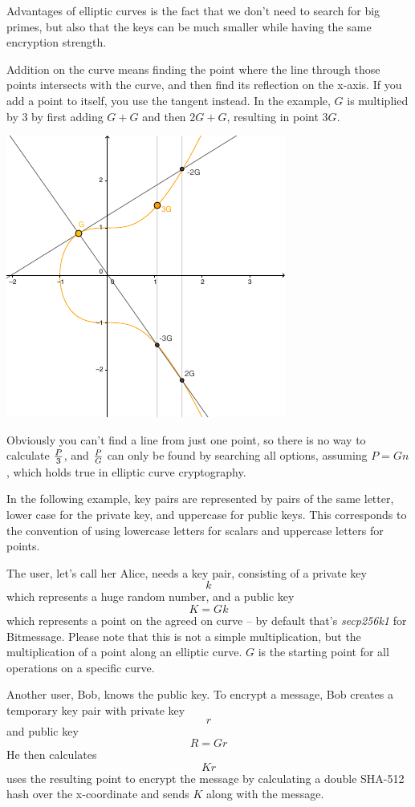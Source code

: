 \documentclass{bfh}
\begin{document}
  Advantages of elliptic curves is the fact that we don't need to search for big primes, but also that the keys can be much smaller while having the same encryption strength.

  Addition on the curve means finding the point where the line through those points intersects with the curve, and then find its reflection on the x-axis. If you add a point to itself, you use the tangent instead. In the example, $G$ is multiplied by 3 by first adding $G+G$ and then $2G+G$, resulting in point $3G$.

  \begin{center}
    \includegraphics[width=0.5 \textwidth]{images/multiplication_on_elliptic_curve.pdf}
  \end{center}

  Obviously you can't find a line from just one point, so there is no way to calculate $P \over 3$, and $P \over G$ can only be found by searching all options, assuming $P = G n$, which holds true in elliptic curve cryptography.

  In the following example, key pairs are represented by pairs of the same letter, lower case for the private key, and uppercase for public keys. This corresponds to the convention of using lowercase letters for scalars and uppercase letters for points.

  The user, let's call her Alice, needs a key pair, consisting of a private key
$$k$$
which represents a huge random number, and a public key
$$K = G k$$
which represents a point on the agreed on curve -- by default that's \textit{secp256k1} for Bitmessage. Please note that this is not a simple multiplication, but the multiplication of a point along an elliptic curve. $G$ is the starting point for all operations on a specific curve.

  Another user, Bob, knows the public key. To encrypt a message, Bob creates a temporary key pair with private key
$$r$$
and public key
$$R = G r$$
He then calculates
$$K r$$
uses the resulting point to encrypt the message by calculating a double SHA-512 hash over the x-coordinate and sends $K$ along with the message.
\end{document}
